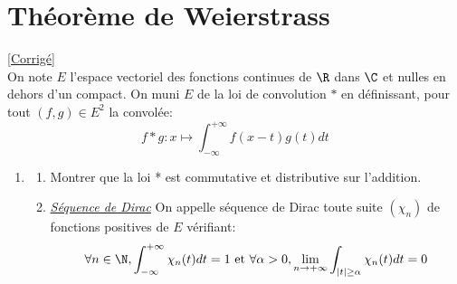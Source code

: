 \documentclass{book}
\begin{document}
	\section{Théorème de Weierstrass}
	\textcolor{blue}{\hyperref[sec:theoreme-de-weierstrass]{[Corrigé]}}\\
	\label{Théorème de Weierstrass}
	On note $E$ l'espace vectoriel des fonctions continues de $\R$ dans $\C$ et nulles en dehors d'un compact. On muni $E$ de la loi de convolution $*$ en définissant, pour tout $(f,g)\in E^2$ la convolée: $$f*g:x\mapsto\int_{-\infty}^{+\infty}f(x-t)g(t)dt$$
	\begin{enumerate}[leftmargin=*]
		\item 
		\begin{enumerate}
			\item Montrer que la loi * est commutative et distributive sur l'addition.
			\item\underline{\textit{Séquence de Dirac}} On appelle séquence de Dirac toute suite $(\chi_n)$ de fonctions positives de $E$ vérifiant:
			$$\forall n\in\N, \int_{-\infty}^{+\infty} \chi_n(t)dt=1 \ \text{et} \ \forall \alpha>0, \lim_{n\to+\infty }\int_{|t|\geq\alpha}\chi_n(t)dt=0$$
		\end{enumerate} 
		\setcounter{saveenum}{\value{enumi}}
	\end{enumerate}
	
\end{document}
